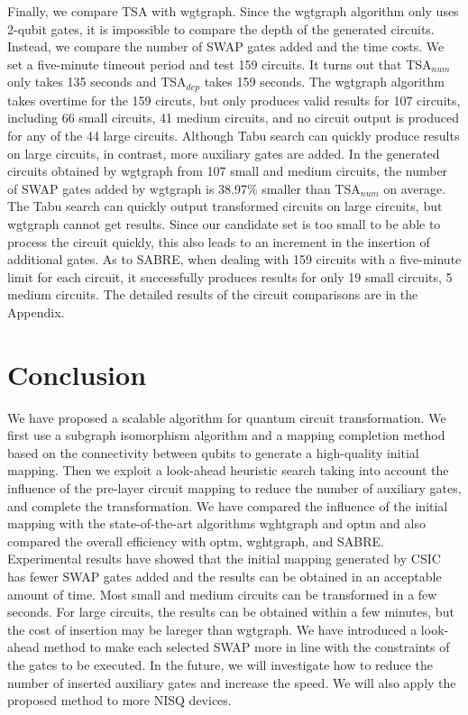\documentclass[journal]{IEEEtran}
\begin{document}
	Finally, we compare TSA with wgtgraph.  Since the wgtgraph algorithm only uses 2-qubit gates, it is impossible to compare the depth of the generated circuits.  Instead, we compare the number of SWAP gates added and the time costs. 
	We set a five-minute timeout period and test 159 circuits. It turns out that TSA$_{num}$ only takes 135 seconds and TSA$_{dep}$ takes 159 seconds. The  wgtgraph algorithm takes overtime for the 159 circuts,  but only produces valid results for 107 circuits, including 66 small circuits,  41 medium circuits,  and no circuit output is produced for any of the 44 large circuits. Although Tabu search can quickly produce results on large circuits, in contrast,  more auxiliary gates are added.  In the generated circuits obtained by wgtgraph from 107 small and medium circuits,  the number of SWAP gates added by wgtgraph is 38.97\%  smaller than TSA$_{num}$ on average. The Tabu search can quickly output transformed circuits on large circuits, but wgtgraph cannot get results. Since  our candidate set is too small to be able to process the circuit quickly,  this also leads to an increment in the insertion of additional gates. As to SABRE, when dealing with 159 circuits with a five-minute limit for each circuit, it successfully produces results for only 19 small circuits, 5 medium circuits. The detailed results of the circuit comparisons are in the Appendix. 
	
	\section{Conclusion}
	\label{Conclusion}
	We have proposed a scalable algorithm for quantum circuit transformation. We first use a subgraph isomorphism algorithm and a mapping completion method based on the connectivity between qubits to generate a high-quality initial mapping. Then we exploit a look-ahead heuristic search taking into account the influence of the pre-layer circuit mapping to reduce the number of auxiliary gates, and complete the transformation. We have compared the influence of the initial mapping  with the state-of-the-art algorithms wghtgraph and optm and also compared the overall efficiency with optm, wghtgraph, and SABRE.
	Experimental results have showed that the initial mapping generated by CSIC has fewer SWAP gates added and the results can be obtained in an acceptable amount of time. Most small and medium circuits can be transformed in a few seconds.
	For large circuits, the results can be obtained within a few minutes,
	but the cost of insertion may be lareger than wgtgraph.
	We have introduced a look-ahead method to make each selected SWAP more in line with the constraints of the gates to be executed.
	In the future, we will investigate how to reduce the number of inserted auxiliary gates  and increase the speed. We will also apply the proposed method to more NISQ devices.
	
\end{document}
